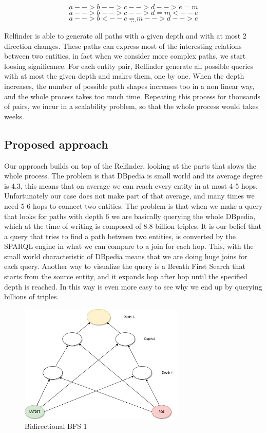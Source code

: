 \documentclass[paper=a4, fontsize=11pt]{scrartcl}
\begin{document}
$$a-->b-->c-->d-->e=m$$
$$a-->b-->c-->d=m<--e$$
$$a-->b<--c=m-->d-->e$$
$$\cdots$$

Relfinder is able to generate all paths with a given depth and with at most 2 direction changes.
These paths can express most of the interesting relations between two entities, in fact when we consider more complex paths, we start loosing significance.
For each entity pair, Relfinder generate all possible queries with at most the given depth and makes them, one by one.
When the depth increases, the number of possible path shapes increases too in a non linear way, and the whole process takes too much time. Repeating this process for thousands of pairs, we incur in a scalability problem, so that the whole process would takes weeks.

\subsection{Proposed approach}
Our approach builds on top of the Relfinder, looking at the parts that slows the whole process.
The problem is that DBpedia is small world and its average degree is 4.3, this means that on average we can reach every entity in at most 4-5 hops. Unfortunately our case does not make part of that average, and many times we need 5-6 hops to connect two entities. The problem is that when we make a query that looks for paths with depth 6 we are basically querying the whole DBpedia, which at the time of writing is composed of 8.8 billion triples.
It is our belief that a query that tries to find a path between two entities, is converted by the SPARQL engine in what we can compare to a join for each hop. This, with the small world characteristic of DBpedia means that we are doing huge joins for each query.
Another way to visualize the query is a Breath First Search that starts from the source entity, and it expands hop after hop until the specified depth is reached. In this way is even more easy to see why we end up by querying billions of triples.

\begin{figure}[!htb]
  \centering
    \includegraphics[width=0.7\textwidth]{images/Path_Discovering.jpg}
    \caption{Bidirectional BFS 1}
\end{figure}
\end{document}
